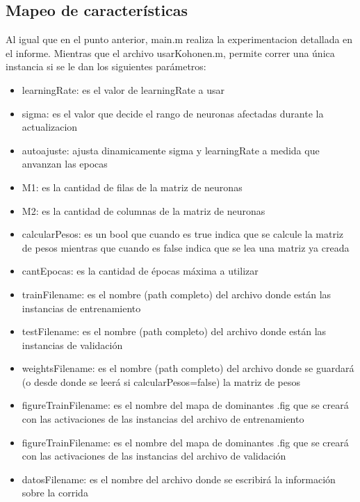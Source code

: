 \documentclass[informe.tex]{subfiles}
\begin{document}
     \subsection{Mapeo de características}
      Al igual que en el punto anterior, main.m realiza la experimentacion detallada en el informe. Mientras que el archivo usarKohonen.m, permite correr una \'unica instancia si se le dan los siguientes par\'ametros:
      
      \begin{itemize}
	\item learningRate: es el valor de learningRate a usar
	\item sigma: es el valor que decide el rango de neuronas afectadas durante la actualizacion
	\item autoajuste: ajusta dinamicamente sigma  y learningRate a medida que anvanzan las epocas
	\item M1: es la cantidad de filas de la matriz de neuronas
	\item M2: es la cantidad de columnas de la matriz de neuronas
	\item calcularPesos: es un bool que cuando es true indica que se calcule la matriz de pesos mientras que cuando es false indica que se lea una matriz ya creada
	\item cantEpocas: es la cantidad de \'epocas m\'axima a utilizar
	\item trainFilename: es el nombre (path completo) del archivo donde est\'an las instancias de entrenamiento
	\item testFilename: es el nombre (path completo) del archivo donde est\'an las instancias de validaci\'on
	\item weightsFilename: es el nombre (path completo) del archivo donde se guardar\'a (o desde donde se leer\'a si calcularPesos=false) la matriz de pesos
	\item figureTrainFilename: es el nombre del mapa de dominantes .fig que se crear\'a con las activaciones de las instancias del archivo de entrenamiento
	\item figureTrainFilename: es el nombre del mapa de dominantes .fig que se crear\'a con las activaciones de las instancias del archivo de validaci\'on
	\item datosFilename: es el nombre del archivo donde se escribir\'a la informaci\'on sobre la corrida
      \end{itemize}
      
    
\end{document}
